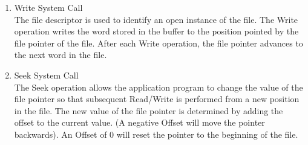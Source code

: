 \begin{enumerate}
\item{Write System Call}
\vspace{2mm}\\
The file descriptor is used to identify an open instance of the file. The Write operation writes the word stored in the buffer to the position pointed by the file pointer of the file. After each Write operation, the file pointer advances to the next word in the file.

\item{Seek System Call}
\vspace{3mm}\\
The Seek operation allows the application program to change the value of the file pointer so that subsequent Read/Write is performed from a new position in the file. The new value of the file pointer is determined by adding the offset to the current value. (A negative Offset will move the pointer backwards). An Offset of 0 will reset the pointer to the beginning of the file. 
\end{enumerate}

